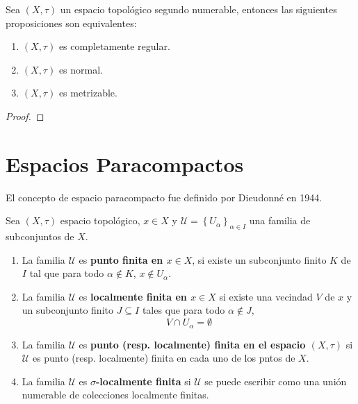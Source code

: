 \documentclass[12pt]{report}
\newcounter{it}
\theoremstyle{largebreak}
\begin{document}
    \begin{excer}
        Sea $(X,\tau)$ un espacio topológico segundo numerable, entonces las siguientes proposiciones son equivalentes:
        \begin{enumerate}
            \item $(X,\tau)$ es completamente regular.
            \item $(X,\tau)$ es normal.
            \item $(X,\tau)$ es metrizable.
        \end{enumerate}
    \end{excer}

    \begin{proof}
    \end{proof}

    \section{Espacios Paracompactos}

    \begin{obs}
        El concepto de espacio paracompacto fue definido por Dieudonné en 1944.
    \end{obs}

    \begin{mydef}
        Sea $(X,\tau)$ espacio topológico, $x\in X$ y $\mathcal{U}=\left\{U_\alpha \right\}_{ \alpha\in I}$ una familia de subconjuntos de $X$.
        \begin{enumerate}
            \item La familia $\mathcal{U}$ es \textbf{punto finita en $x\in X$}, si existe un subconjunto finito $K$ de $I$ tal que para todo $\alpha\notin K$, $x\notin U_\alpha$.
            \item La familia $\mathcal{U}$ es \textbf{localmente finita en $x\in X$} si existe una vecindad $V$ de $x$ y un subconjunto finito $J\subseteq I$ tales que para todo $\alpha\notin J$,
            \begin{equation*}
                V\cap U_\alpha=\emptyset
            \end{equation*}
            \item La familia $\mathcal{U}$ es \textbf{punto (resp. localmente) finita en el espacio $(X,\tau)$} si $\mathcal{U}$ es punto (resp. localmente) finita en cada uno de los pntos de $X$.
            \item La familia $\mathcal{U}$ es \textbf{$\sigma$-localmente finita} si $\mathcal{U}$ se puede escribir como una unión numerable de colecciones localmente finitas.
        \end{enumerate}
    \end{mydef}
\end{document}
